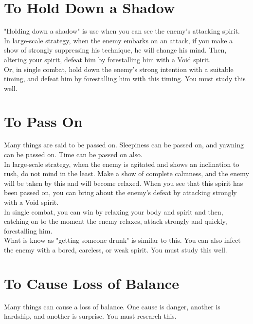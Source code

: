 \section{To Hold Down a Shadow}

"Holding down a shadow" is use when you can see the enemy's attacking spirit.\\

In large-scale strategy, when the enemy embarks on an attack, if you make a show of strongly suppressing his technique, he will change his mind. Then, altering your spirit, defeat him by forestalling him with a Void spirit.\\

Or, in single combat, hold down the enemy's strong intention with a suitable timing, and defeat him by forestalling him with this timing. You must study this well.\\
\section{To Pass On}

Many things are said to be passed on. Sleepiness can be passed on, and yawning can be passed on. Time can be passed on also.\\

In large-scale strategy, when the enemy is agitated and shows an inclination to rush, do not mind in the least. Make a show of complete calmness, and the enemy will be taken by this and will become relaxed. When you see that this spirit has been passed on, you can bring about the enemy's defeat by attacking strongly with a Void spirit.\\

In single combat, you can win by relaxing your body and spirit and then, catching on to the moment the enemy relaxes, attack strongly and quickly, forestalling him.\\

What is know as "getting someone drunk" is similar to this. You can also infect the enemy with a bored, careless, or weak spirit. You must study this well.\\
\section{To Cause Loss of Balance}

Many things can cause a loss of balance. One cause is danger, another is hardship, and another is surprise. You must research this.\\

